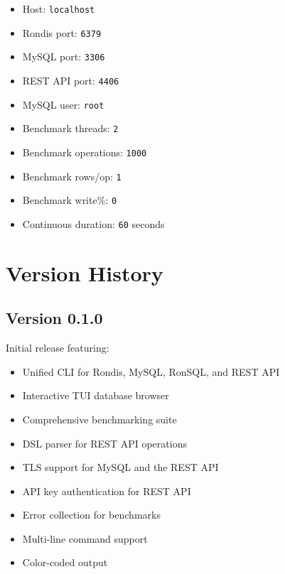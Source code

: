 \documentclass[11pt,a4paper]{report}
\begin{document}
\begin{itemize}
    \item Host: \texttt{localhost}
    \item Rondis port: \texttt{6379}
    \item MySQL port: \texttt{3306}
    \item REST API port: \texttt{4406}
    \item MySQL user: \texttt{root}
    \item Benchmark threads: \texttt{2}
    \item Benchmark operations: \texttt{1000}
    \item Benchmark rows/op: \texttt{1}
    \item Benchmark write\%: \texttt{0}
    \item Continuous duration: \texttt{60} seconds
\end{itemize}

\chapter{Version History}

\section{Version 0.1.0}

Initial release featuring:
\begin{itemize}
    \item Unified CLI for Rondis, MySQL, RonSQL, and REST API
    \item Interactive TUI database browser
    \item Comprehensive benchmarking suite
    \item DSL parser for REST API operations
    \item TLS support for MySQL and the REST API
    \item API key authentication for REST API
    \item Error collection for benchmarks
    \item Multi-line command support
    \item Color-coded output
\end{itemize}
\end{document}
